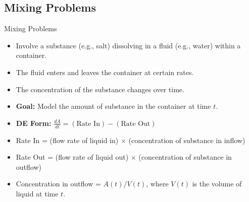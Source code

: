 \documentclass[10pt,aspectratio=169]{beamer}
\begin{document}
\subsection{Mixing Problems}
\begin{frame}{Mixing Problems}
    \begin{itemize}
        \item Involve a substance (e.g., salt) dissolving in a fluid (e.g., water) within a container.
        \item The fluid enters and leaves the container at certain rates.
        \item The concentration of the substance changes over time.
        \item \textbf{Goal:} Model the amount of substance in the container at time $t$.
        \item \textbf{DE Form:} $\frac{dA}{dt} = (\text{Rate In}) - (\text{Rate Out})$
        \item Rate In = (flow rate of liquid in) $\times$ (concentration of substance in inflow)
        \item Rate Out = (flow rate of liquid out) $\times$ (concentration of substance in outflow)
        \item Concentration in outflow = $A(t) / V(t)$, where $V(t)$ is the volume of liquid at time $t$.
    \end{itemize}
\end{frame}
\end{document}
